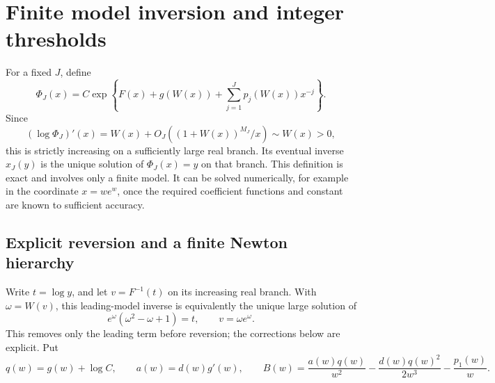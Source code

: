 \documentclass[11pt,letterpaper]{article}
\theoremstyle{remark}\newtheorem{remark}[theorem]{Remark}
\begin{document}
\section{Finite model inversion and integer thresholds}\label{tak:sec:inverse}
For a fixed $J$, define
\begin{equation}
 \Phi_J(x)=C\exp\left\{F(x)+g(W(x))+\sum_{j=1}^Jp_j(W(x))x^{-j}\right\}.
\end{equation}
Since
\begin{equation}
 (\log\Phi_J)'(x)=W(x)+O_J((1+W(x))^{M_J}/x)\sim W(x)>0,\label{tak:eq:slope}
\end{equation}
this is strictly increasing on a sufficiently large real branch. Its eventual inverse $x_J(y)$ is the unique solution of $\Phi_J(x)=y$ on that branch. This definition is exact and involves only a finite model. It can be solved numerically, for example in the coordinate $x=we^w$, once the required coefficient functions and constant are known to sufficient accuracy.

\subsection{Explicit reversion and a finite Newton hierarchy}
Write $t=\log y$, and let $v=F^{-1}(t)$ on its increasing real branch. With $\omega=W(v)$, this leading-model inverse is equivalently the unique large solution of
\[
 e^\omega(\omega^2-\omega+1)=t,\qquad v=\omega e^\omega.
\]
This removes only the leading term before reversion; the corrections below are explicit. Put
\begin{equation}
 q(w)=g(w)+\log C,\qquad a(w)=d(w)g'(w),\qquad
 B(w)=\frac{a(w)q(w)}{w^2}-\frac{d(w)q(w)^2}{2w^3}-\frac{p_1(w)}w.
 \label{tak:eq:inverseB}
\end{equation}
\end{document}
